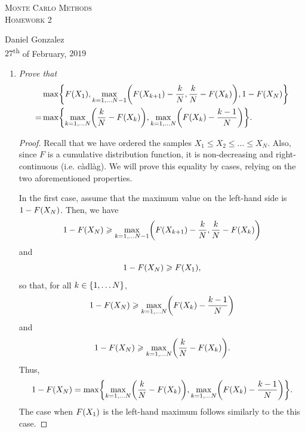 \documentclass{article}
\renewcommand{\leq}{\leqslant}
\renewcommand{\geq}{\geqslant}
\DeclarePairedDelimiter \set{\lbrace}{\rbrace}
\DeclarePairedDelimiter \parens{(}{)}
\begin{document}
\begin{center}
    \textsc{\huge Monte Carlo Methods}\\
    \textsc{\Large Homework 2}\\
\end{center}
\begin{flushright}
    Daniel Gonzalez\\
    $27$\textsuperscript{th} of February, $2019$
\end{flushright}

\begin{enumerate}
    \item
        {\it Prove that
        \begin{align*}
            &\max\set*{F\parens*{X_1}, \max_{k = 1, \dots N-1}\parens*{F\parens*{X_{k+1}} - \frac{k}{N}, \frac{k}{N} - F\parens*{X_k}}, 1 - F\parens*{X_N}}\\
            = &\max\set*{\max_{k = 1, \dots N}\parens*{\frac{k}{N} - F\parens*{X_k}}, \max_{k = 1, \dots N}\parens*{F\parens*{X_k} - \frac{k-1}{N}}}.
        \end{align*}}
        \begin{proof}
            Recall that we have ordered the samples $X_1 \leq X_2 \leq \dots \leq X_N$.
            Also, since $F$ is a cumulative distribution function, it is non-decreasing and right-continuous (i.e. c\`adl\`ag).
            We will prove this equality by cases, relying on the two aforementioned properties.

            In the first case, assume that the maximum value on the left-hand side is $1 - F\parens*{X_N}$.
            Then, we have
            \begin{equation*}
                1 - F\parens*{X_N} \geq \max_{k = 1, \dots N-1}\parens*{F\parens*{X_{k+1}} - \frac{k}{N}, \frac{k}{N} - F\parens*{X_k}}
            \end{equation*}
            and
            \begin{equation*}
                1 - F\parens*{X_N} \geq F\parens*{X_1},
            \end{equation*}
            so that, for all $k \in \set*{1, \dots N}$,
            \begin{equation*}
                1 - F\parens*{X_N} \geq \max_{k = 1, \dots N}\parens*{F\parens*{X_k} - \frac{k-1}{N}}
            \end{equation*}
            and
            \begin{equation*}
                1 - F\parens*{X_N} \geq \max_{k = 1, \dots N}\parens*{\frac{k}{N} - F\parens*{X_k}}.
            \end{equation*}
            Thus,
            \begin{equation*}
                1 - F\parens*{X_N} = \max\set*{\max_{k = 1, \dots N}\parens*{\frac{k}{N} - F\parens*{X_k}}, \max_{k = 1, \dots N}\parens*{F\parens*{X_k} - \frac{k-1}{N}}}.
            \end{equation*}
            The case when $F\parens*{X_1}$ is the left-hand maximum follows similarly to the this case.


\end{proof}
\end{enumerate}
\end{document}
